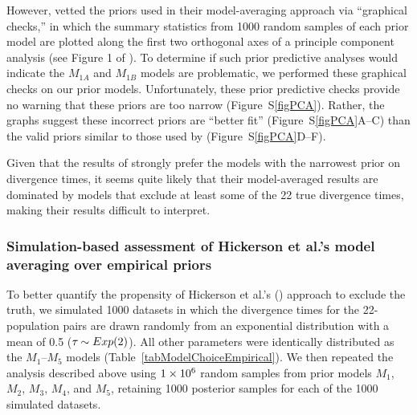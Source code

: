 However, \citet{Hickerson2013} vetted the priors used in their model-averaging
approach via ``graphical checks,'' in which the summary statistics from 1000
random samples of each prior model are plotted along the first two orthogonal
axes of a principle component analysis (see Figure 1 of \citet{Hickerson2013}).
To determine if such prior predictive analyses would indicate the $M_{1A}$ and
$M_{1B}$ models are problematic, we performed these graphical checks on our
prior models.
Unfortunately, these prior predictive checks provide no warning that these
priors are too narrow (Figure~S\ref{figPCA}).
Rather, the graphs suggest these incorrect priors are ``better fit''
(Figure~S\ref{figPCA}A--C) than the valid priors similar to those used by
\citet{Oaks2012} (Figure~S\ref{figPCA}D--F).

Given that the results of \citet{Hickerson2013} strongly prefer the models with
the narrowest prior on divergence times, it seems quite likely that their
model-averaged results are dominated by models that exclude at least some of
the 22 true divergence times, making their results difficult to interpret.


\subsubsection*{Simulation-based assessment of Hickerson et al.'s
\citeyear{Hickerson2013} model averaging over empirical priors}

To better quantify the propensity of Hickerson et al.'s
(\citeyear{Hickerson2013}) approach to exclude the truth, we simulated 1000
datasets in which the divergence times for the 22-population pairs are drawn
randomly from an exponential distribution with a mean of 0.5 ($\tau_{} \sim
Exp(2)$).
All other parameters were identically distributed as the $M_1$--$M_5$ models
(Table~\ref{tabModelChoiceEmpirical}).
We then repeated the analysis described above using $1\times 10^{6}$ random samples from
prior models $M_1$, $M_2$, $M_3$, $M_4$, and $M_5$, retaining 1000 posterior
samples for each of the 1000 simulated datasets.

